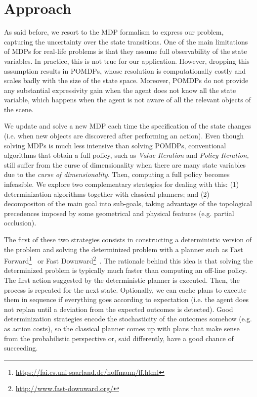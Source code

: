 \documentclass[../root.tex]{subfiles}
\begin{document}
\section{Approach}

As said before, we resort to the MDP
formalism to express our problem, capturing the uncertainty over
the state transitions.
One of the main limitations of MDPs for
real-life problems is that they assume full observability of the state variables.
In practice, this is not true for our application. However, dropping this
assumption results in POMDPs, whose resolution is computationally costly
and scales badly with the size of the state space. Moreover, POMDPs do
not provide any substantial expressivity gain when the agent does not know all
the state variable, which happens when the agent is not aware of all
the relevant objects of the scene.

We update and solve a new MDP each
time the specification of the state changes (i.e. when new objects are discovered
after performing an action).
Even though solving MDPs is much less intensive than
solving POMDPs, conventional algorithms that obtain a full policy, such
as \emph{Value Iteration} and
\emph{Policy Iteration}, still suffer from the curse of dimensionality when there
are many state variables due to the \emph{curse of dimensionality}.
Then, computing a full policy becomes infeasible.
We explore two complementary strategies for dealing with this: (1)
determinization algorithms together with classical planners; and (2)
decompositon of the main goal into sub-goals, taking advantage of the
topological precedences imposed by some geometrical
and physical features (e.g. partial occlusion).

The first of these two strategies consists in constructing a deterministic
version of the problem and solving the determinized problem with a planner
such as Fast Forward\footnote{%
\url{https://fai.cs.uni-saarland.de/hoffmann/ff.html}}~\cite{hoffman2001ff} or
Fast Downward\footnote{\url{http://www.fast-downward.org/}}~\cite{helmert2006fast}.
The rationale behind this idea is that solving the determinized problem
is typically much faster than computing an off-line policy. The first
action suggested by the deterministic planner is executed. Then, the process
is repeated for the next state. Optionally, we can cache plans to
execute them in sequence if everything goes according to expectation (i.e.
the agent does not replan until a deviation from the expected outcomes is
detected).
Good determinization strategies encode the stochasticity of the outcomes
somehow (e.g. as action costs), so the classical planner comes up with plans
that make sense from the probabilistic perspective or, said differently, have
a good chance of succeeding.
\end{document}
